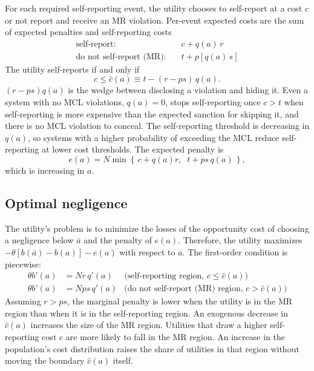 \documentclass{article}
\begin{document}
	For each required self-reporting event, the utility chooses to self-report at a cost $c$ or not report and receive an MR violation. Per-event expected costs are the sum of expected penalties and self-reporting costs
	\begin{align*}
		\text{self-report:} \quad & c + q(a)\,r \\
		\text{do not self-report (MR):} \quad & t + p\left[q(a)\,s\right]
	\end{align*}
	The utility self-reports if and only if
	\begin{equation}\label{eq:chat}
		c \le \hat{c}(a) \equiv t - (r - ps)\,q(a).
	\end{equation}
	$(r − ps)q(a)$ is the wedge between disclosing a violation and hiding it. Even a system with no MCL violations, $q(a) = 0$, stops self-reporting once $c > t$ when self-reporting is more expensive than the expected sanction for skipping it, and there is no MCL violation to conceal. The self-reporting threshold is decreasing in $q(a)$, so systems with a higher probability of exceeding the MCL reduce self-reporting at lower cost thresholds. The expected penalty is
	\begin{equation}\label{eq:endog_penalty}
		e(a) = N \min\left\{\, c + q(a)r,\;\; t + ps\,q(a) \,\right\},
	\end{equation}
	which is increasing in $a$.
	
	\subsection{Optimal negligence}
	
	The utility's problem is to minimize the losses of the opportunity cost of choosing a negligence below $\bar{a}$ and the penalty of $e(a)$. Therefore, the utility maximizes $-\theta[b(\bar{a}) - b(a)] - e(a)$ with respect to $a$. 
    The first-order condition is piecewise:
	\begin{align}
		\theta b'(a) &= N r\, q'(a) & \text{(self-reporting region, } c \le \hat{c}(a)) \\
		\theta b'(a) &= N ps\, q'(a) & \text{(do not self-report (MR) region, } c > \hat{c}(a))
	\end{align}
	Assuming $r > ps$, the marginal penalty is lower when the utility is in the MR region than when it is in the self-reporting region. An exogenous decrease in $\hat{c}(a)$ increases the size of the MR region. Utilities that draw a higher self-reporting cost c are more likely to fall in the MR region. An increase in the population's cost distribution raises the share of utilities in that region without moving the boundary $\hat{c}(a)$ itself.
	
\end{document}
